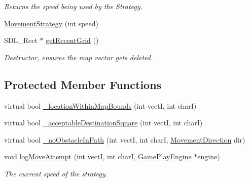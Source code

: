 \begin{DoxyCompactItemize}
\begin{DoxyCompactList}\small\item\em Returns the speed being used by the Strategy. \end{DoxyCompactList}\item 
\hyperlink{class_movement_strategy_af30f05e5af1a565613b355770b35e3cf}{Movement\+Strategy} (int speed)
\item 
\hypertarget{class_movement_strategy_ae06af7f5c73eaf3fdade049d6ad116b4}{}\label{class_movement_strategy_ae06af7f5c73eaf3fdade049d6ad116b4} 
S\+D\+L\+\_\+\+Rect $\ast$ \hyperlink{class_movement_strategy_ae06af7f5c73eaf3fdade049d6ad116b4}{get\+Recent\+Grid} ()
\begin{DoxyCompactList}\small\item\em Destructor, ensures the map vector gets deleted. \end{DoxyCompactList}\end{DoxyCompactItemize}
\subsection*{Protected Member Functions}
\begin{DoxyCompactItemize}
\item 
virtual bool \hyperlink{class_movement_strategy_a17c50742bdde51e69223c49ec484bf95}{\+\_\+location\+Within\+Map\+Bounds} (int vectI, int charI)
\item 
virtual bool \hyperlink{class_movement_strategy_a7767e4732545752f69dab06fe478152c}{\+\_\+acceptable\+Destination\+Square} (int vectI, int charI)
\item 
virtual bool \hyperlink{class_movement_strategy_aad894d7e60bd63c88d5d7fd1a41dc400}{\+\_\+no\+Obstacle\+In\+Path} (int vectI, int charI, \hyperlink{_movement_strategy_8h_a0b5e764f0ec9a407e9b8789f0259d754}{Movement\+Direction} dir)
\item 
\hypertarget{class_movement_strategy_a2c69ae8979b1de50cdefbbceedc935db}{}\label{class_movement_strategy_a2c69ae8979b1de50cdefbbceedc935db} 
void \hyperlink{class_movement_strategy_a2c69ae8979b1de50cdefbbceedc935db}{log\+Move\+Attempt} (int vectI, int charI, \hyperlink{class_game_play_engine}{Game\+Play\+Engine} $\ast$engine)
\begin{DoxyCompactList}\small\item\em The current speed of the strategy. \end{DoxyCompactList}\end{DoxyCompactItemize}
